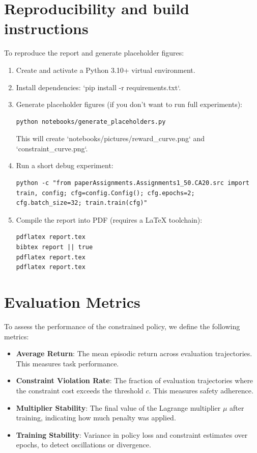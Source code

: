 \section{Reproducibility and build instructions}
\label{sec:repro}
To reproduce the report and generate placeholder figures:
\begin{enumerate}
  \item Create and activate a Python 3.10+ virtual environment.
  \item Install dependencies: `pip install -r requirements.txt`.
  \item Generate placeholder figures (if you don't want to run full experiments):
  \begin{verbatim}
python notebooks/generate_placeholders.py
  \end{verbatim}
  This will create `notebooks/pictures/reward_curve.png` and `constraint_curve.png`.
  \item Run a short debug experiment:
  \begin{verbatim}
python -c "from paperAssignments.Assignments1_50.CA20.src import train, config; cfg=config.Config(); cfg.epochs=2; cfg.batch_size=32; train.train(cfg)"
  \end{verbatim}
  \item Compile the report into PDF (requires a LaTeX toolchain):
  \begin{verbatim}
pdflatex report.tex
bibtex report || true
pdflatex report.tex
pdflatex report.tex
  \end{verbatim}
\end{enumerate}

\section{Evaluation Metrics}
\label{sec:eval}

To assess the performance of the constrained policy, we define the following metrics:

\begin{itemize}
  \item \textbf{Average Return}: The mean episodic return across evaluation trajectories. This measures task performance.
  \item \textbf{Constraint Violation Rate}: The fraction of evaluation trajectories where the constraint cost exceeds the threshold $c$. This measures safety adherence.
  \item \textbf{Multiplier Stability}: The final value of the Lagrange multiplier $\mu$ after training, indicating how much penalty was applied.
  \item \textbf{Training Stability}: Variance in policy loss and constraint estimates over epochs, to detect oscillations or divergence.
\end{itemize}

